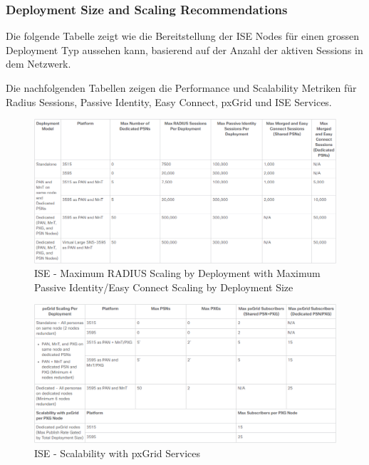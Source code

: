 \subsubsection{Deployment Size and Scaling Recommendations
}

Die folgende Tabelle zeigt wie die Bereitstellung der ISE Nodes für einen grossen Deployment Typ aussehen kann, basierend auf der Anzahl der aktiven Sessions in dem Netzwerk.


Die nachfolgenden Tabellen zeigen die Performance und Scalability Metriken für Radius Sessions, Passive Identity, Easy Connect, pxGrid und ISE Services.

\begin{figure}[H]
	\centering
	\includegraphics[width=1\linewidth]{img/Absicherung/ISE-MaxRadiusScaling}
	\caption{ISE - Maximum RADIUS Scaling by Deployment with Maximum Passive Identity/Easy Connect Scaling by Deployment Size \cite{ise-scale}}
	\label{fig:ISE - Maximum RADIUS Scaling}
\end{figure}

\begin{figure}[H]
	\centering
	\includegraphics[width=1\linewidth]{img/Absicherung/ISE-pxGridServicesScalability}
	\caption{ISE - Scalability with pxGrid Services \cite{ise-scale}}
	\label{fig:ISE - Scalability with pxGrid Service}
\end{figure}

